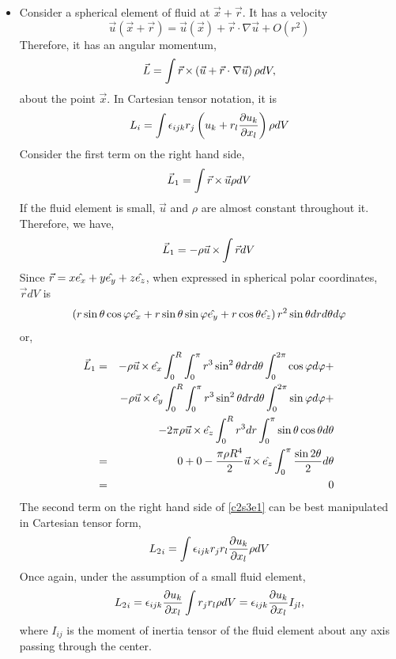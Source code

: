 \begin{itemize}
\item Consider a spherical element of fluid at $\vec{x} + \vec{r}$. It has a velocity 
\[
\vec{u}(\vec{x} + \vec{r}) = \vec{u}(\vec{x}) + \vec{r}\cdot\nabla\vec{u} + O(r^2) 
\]
Therefore, it has an angular momentum,
\begin{equation}\label{c2s3e1}
\vec{L} = \int \vec{r}\operatorname{\times}\left(\vec{u} + \vec{r}\cdot\nabla\vec{u}\right)\rho dV,
\end{equation}
about the point $\vec{x}$. In Cartesian tensor notation, it is
\begin{equation}\label{c2s3e2}
L_i = \int\epsilon_{ijk} r_j\left(u_k + r_l\frac{\partial{u_k}}{\partial{x_l}}\right)\rho dV
\end{equation}
Consider the first term on the right hand side,
\[
\vec{L}_1 = \int \vec{r}\operatorname{\times}\vec{u}\rho dV
\]
If the fluid element is small, $\vec{u}$ and $\rho$ are almost constant throughout it. Therefore, we have,
\[
\vec{L}_1 = -\rho\vec{u}\operatorname{\times}\int\vec{r}dV
\]
Since $\vec{r} = x\hat{e_{x}} + y\hat{e_{y}} + z\hat{e_{z}}$, when expressed in spherical polar coordinates, $\vec{r}dV$ is
\[
\left(r\sin\theta\cos\varphi\hat{e_{x}}+r\sin\theta\sin\varphi\hat{e_{y}}+r\cos\theta\hat{e_{z}}\right)r^2\sin\theta dr d\theta d\varphi
\]
or,
\begin{eqnarray*}
\vec{L}_1 &=& -\rho\vec{u}\operatorname{\times}\hat{e_{x}}\int_0^R\int_0^{\pi}r^3\sin^2\theta dr d\theta \int_0^{2\pi}\cos\varphi d\varphi + \\
 & & -\rho\vec{u}\operatorname{\times}\hat{e_{y}}\int_0^R\int_0^{\pi}r^3\sin^2\theta dr d\theta \int_0^{2\pi}\sin\varphi d\varphi + \\
 & & -2\pi\rho\vec{u}\operatorname{\times}\hat{e_{z}}\int_0^R r^3 dr \int_0^{\pi} \sin\theta\cos\theta d\theta \\
 &=& 0 + 0 - \frac{\pi\rho R^4}{2}\vec{u}\operatorname{\times}\hat{e_{z}} \int_0^{\pi} \frac{\sin 2\theta}{2} d\theta \\
 &=& 0
\end{eqnarray*}
The second term on the right hand side of \eqref{c2s3e1} can be best manipulated in Cartesian tensor form,
\[
{L_2}_i = \int\epsilon_{ijk} r_jr_l\frac{\partial{u_k}}{\partial{x_l}} \rho dV
\]
Once again, under the assumption of a small fluid element,
\begin{equation}\label{c2s3e3}
{L_2}_i = \epsilon_{ijk}\frac{\partial{u_k}}{\partial{x_l}} \int r_j r_l \rho dV = \epsilon_{ijk}\frac{\partial{u_k}}{\partial{x_l}} I_{jl},
\end{equation}
where $I_{ij}$ is the moment of inertia tensor of the fluid element about any axis passing through the center. 


\end{itemize}
